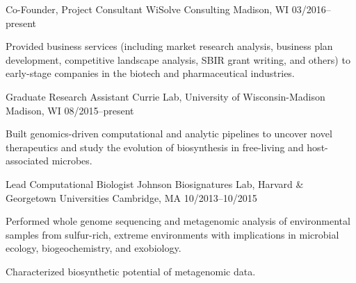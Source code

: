 

\begin{cventries}

  \cventry
    {Co-Founder, Project Consultant} %
    {WiSolve Consulting} %
    {Madison, WI} %
    {03/2016--present} %
    {
      \begin{cvitems} %
        \item {Provided business services (including market research analysis, business plan development, competitive landscape analysis, SBIR grant writing, and others) to early-stage companies in the biotech and pharmaceutical industries.}
      \end{cvitems}
    }

  \cventry
    {Graduate Research Assistant} %
    {Currie Lab, University of Wisconsin-Madison} %
    {Madison, WI} %
    {08/2015--present} %
    {
      \begin{cvitems} %
        \item {Built genomics-driven computational and analytic pipelines to uncover novel therapeutics and study the evolution of biosynthesis in free-living and host-associated microbes.}
      \end{cvitems}
    }

  \cventry
    {Lead Computational Biologist} %
    {Johnson Biosignatures Lab, Harvard \& Georgetown Universities} %
    {Cambridge, MA} %
    {10/2013--10/2015} %
    {
      \begin{cvitems} %
        \item {Performed whole genome sequencing and metagenomic analysis of environmental samples from sulfur-rich, extreme environments with implications in microbial ecology, biogeochemistry, and exobiology.}
        \item {Characterized biosynthetic potential of metagenomic data.}
      \end{cvitems} 
    }
    

\end{cventries}
